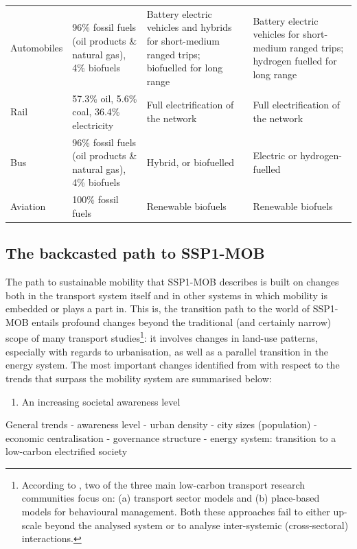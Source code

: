 \begin{landscape}
{\begin{longtable}{p{3cm}p{5cm}p{5cm}p{5cm}}
Automobiles & 96\% fossil fuels (oil products \& natural gas), 4\% biofuels \parencite{iea2017_Statisticswebportal} & Battery electric vehicles and hybrids for short-medium ranged trips; biofuelled for long range & Battery electric vehicles for short-medium ranged trips; hydrogen fuelled for long range \\*
Rail & 57.3\% oil, 5.6\% coal, 36.4\% electricity \parencite{cazzola2016_RailwayHandbook2016} & Full electrification of the network & Full electrification of the network \\*
Bus & 96\% fossil fuels (oil products \& natural gas), 4\% biofuels \parencite{iea2017_Statisticswebportal} & Hybrid, or biofuelled & Electric or hydrogen-fuelled \\*
Aviation & 100\% fossil fuels \parencite{iea2017_Statisticswebportal} & Renewable biofuels & Renewable biofuels
\end{longtable}
}
\end{landscape}

\subsection{The backcasted path to SSP1-MOB}
\label{ss:results:backcasting-the-path}
The path to sustainable mobility that SSP1-MOB describes is built on changes both in the transport system itself and in other systems in which mobility is embedded or plays a part in. This is, the transition path to the world of SSP1-MOB entails profound changes beyond the traditional (and certainly narrow) scope of many transport studies\footnote{According to \textcite{creutzig2015_EvolvingNarrativesLow}, two of the three main low-carbon transport research communities focus on: (a) transport sector models and (b) place-based models for behavioural management. Both these approaches fail to either up-scale beyond the analysed system or to analyse inter-systemic (cross-sectoral) interactions.}: it involves changes in land-use patterns, especially with regards to urbanisation, as well as a parallel transition in the energy system. The most important changes identified from  with respect to the trends that surpass the mobility system are summarised below:
%
\begin{enumerate}
\item An increasing societal awareness level
\end{enumerate}

General trends
 - awareness level
 - urban density
 - city sizes (population)
 - economic centralisation
 - governance structure
 - energy system: transition to a low-carbon electrified society

